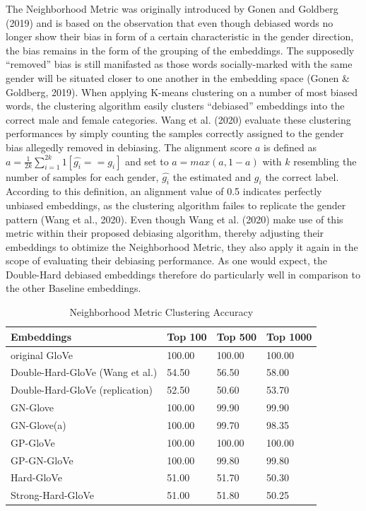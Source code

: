 \documentclass[
  english,
  man,floatsintext]{apa6}
\begin{document}
The Neighborhood Metric was originally introduced by Gonen and Goldberg (2019) and is based on the observation that even though debiased words no longer show their bias in form of a certain characteristic in the gender direction, the bias remains in the form of the grouping of the embeddings. The supposedly \enquote{removed} bias is still manifasted as those words socially-marked with the same gender will be situated closer to one another in the embedding space (Gonen \& Goldberg, 2019).
When applying K-means clustering on a number of most biased words, the clustering algorithm easily clusters \enquote{debiased} embeddings into the correct male and female categories.
Wang et al. (2020) evaluate these clustering performances by simply counting the samples correctly assigned to the gender bias allegedly removed in debiasing. The alignment score \(a\) is defined as \(a = \frac{1}{2k}\sum_{i=1}^{2k}1[\hat{g_{i}}== g_{i}]\) and set to \(a = max(a, 1-a)\) with \(k\) resembling the number of samples for each gender, \(\hat{g_{i}}\) the estimated and \(g_{i}\) the correct label. According to this definition, an alignment value of 0.5 indicates perfectly unbiased embeddings, as the clustering algorithm failes to replicate the gender pattern (Wang et al., 2020).
Even though Wang et al. (2020) make use of this metric within their proposed debiasing algorithm, thereby adjusting their embeddings to obtimize the Neighborhood Metric, they also apply it again in the scope of evaluating their debiasing performance. As one would expect, the Double-Hard debiased embeddings therefore do particularly well in comparison to the other Baseline embeddings.

\begin{table}[tbp]

\begin{center}
\begin{threeparttable}

\caption{\label{tab:table 2}Neighborhood Metric Clustering Accuracy}

\begin{tabular}{llll}
\toprule
Embeddings & Top 100 & Top 500 & Top 1000\\
\midrule
original GloVe & 100.00 & 100.00 & 100.00\\
Double-Hard-GloVe (Wang et al.) & 54.50 & 56.50 & 58.00\\
Double-Hard-GloVe (replication) & 52.50 & 50.60 & 53.70\\
GN-Glove & 100.00 & 99.90 & 99.90\\
GN-Glove(a) & 100.00 & 99.70 & 98.35\\
GP-GloVe & 100.00 & 100.00 & 100.00\\
GP-GN-GloVe & 100.00 & 99.80 & 99.80\\
Hard-GloVe & 51.00 & 51.70 & 50.30\\
Strong-Hard-GloVe & 51.00 & 51.80 & 50.25\\
\bottomrule
\end{tabular}

\end{threeparttable}
\end{center}

\end{table}
\end{document}
